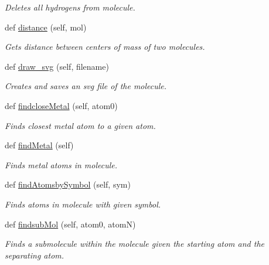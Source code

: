 \begin{DoxyCompactItemize}
\begin{DoxyCompactList}\small\item\em Deletes all hydrogens from molecule. \end{DoxyCompactList}\item 
def \hyperlink{classmolSimplify_1_1Classes_1_1mol3D_1_1mol3D_a7f5c446c9d071037c5500408ab57a8f6}{distance} (self, mol)
\begin{DoxyCompactList}\small\item\em Gets distance between centers of mass of two molecules. \end{DoxyCompactList}\item 
def \hyperlink{classmolSimplify_1_1Classes_1_1mol3D_1_1mol3D_afc2743674602def7c8d9457cb40a2899}{draw\+\_\+svg} (self, filename)
\begin{DoxyCompactList}\small\item\em Creates and saves an svg file of the molecule. \end{DoxyCompactList}\item 
def \hyperlink{classmolSimplify_1_1Classes_1_1mol3D_1_1mol3D_a3a4f5d88b74124789e380f28d1038fad}{findclose\+Metal} (self, atom0)
\begin{DoxyCompactList}\small\item\em Finds closest metal atom to a given atom. \end{DoxyCompactList}\item 
def \hyperlink{classmolSimplify_1_1Classes_1_1mol3D_1_1mol3D_aff49b31bdc2ef9d33a3b67642b6f70d2}{find\+Metal} (self)
\begin{DoxyCompactList}\small\item\em Finds metal atoms in molecule. \end{DoxyCompactList}\item 
def \hyperlink{classmolSimplify_1_1Classes_1_1mol3D_1_1mol3D_adb95387b07a9714c03db4975a192e08c}{find\+Atomsby\+Symbol} (self, sym)
\begin{DoxyCompactList}\small\item\em Finds atoms in molecule with given symbol. \end{DoxyCompactList}\item 
def \hyperlink{classmolSimplify_1_1Classes_1_1mol3D_1_1mol3D_a0b5cecd561856f3b3a7525ce75bc5282}{findsub\+Mol} (self, atom0, atomN)
\begin{DoxyCompactList}\small\item\em Finds a submolecule within the molecule given the starting atom and the separating atom. \end{DoxyCompactList}\item 

\end{DoxyCompactItemize}
